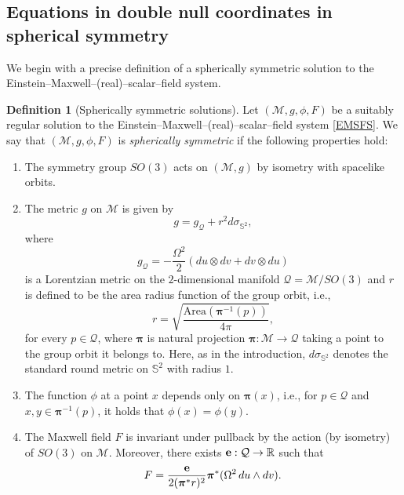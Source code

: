 \documentclass[10pt, reqno]{amsart}
\theoremstyle{definition}
\newtheorem{definition}[theorem]{Definition}
\theoremstyle{remark}
\theoremstyle{conjecture}
\numberwithin{equation}{section}
\newcommand{\0}{\emptyset}
\newcommand{\Omg}{\Omega}
\newcommand{\bfe}{{\bf e}}
\newcommand{\calM}{\mathcal M}
\newcommand{\f}{\frac}
\begin{document}
\subsection{Equations in double null coordinates in spherical symmetry}
We begin with a precise definition of a spherically symmetric solution to the Einstein--Maxwell--(real)--scalar--field system.
\begin{definition}[Spherically symmetric solutions]\label{def.SS}
Let $(\mathcal M,g,\phi,F)$ be a suitably regular solution to the Einstein--Maxwell--(real)--scalar--field system \eqref{EMSFS}. We say that $(\mathcal M,g,\phi,F)$ is \emph{spherically symmetric} if the following properties hold:
\begin{enumerate}
\item The symmetry group $SO(3)$ acts on $(\mathcal M,g)$ by isometry with spacelike orbits.
\item The metric $g$ on $\mathcal M$ is given by
\begin{equation}\label{SS.metric.1}
g=g_{\mathcal Q}+r^2 d\sigma_{\mathbb S^2},
\end{equation}
where
\begin{equation}\label{SS.metric.2}
g_{\mathcal Q}=-\f{\Omg^2 }{2}(du\otimes dv+dv\otimes du)
\end{equation}
is a Lorentzian metric on the $2$-dimensional manifold $\mathcal Q=\mathcal M/SO(3)$ and $r$ is defined to be the area radius function of the group orbit, i.e.,
$$r=\sqrt{\f{\mbox{Area}({\boldsymbol \pi}^{-1}(p))}{4\pi}},$$
for every $p\in \mathcal Q$, where ${\boldsymbol \pi}$ is natural projection ${\boldsymbol \pi}:\mathcal M\to \mathcal Q$ taking a point to the group orbit it belongs to. Here, as in the introduction, $d\sigma_{\mathbb S^2}$ denotes the standard round metric on $\mathbb S^2$ with radius $1$.
\item The function $\phi$ at a point $x$ depends only on ${\boldsymbol \pi}(x)$, i.e., for $p\in \mathcal Q$ and $x,y\in {\boldsymbol \pi}^{-1}(p)$, it holds that $\phi(x)=\phi(y)$.
\item The Maxwell field $F$ is invariant under pullback by the action (by isometry) of $SO(3)$ on $\calM$.
Moreover, there exists ${\bf e}:\mathcal Q\to \mathbb R$ such that
$$F=\f{\bfe}{2({\boldsymbol \pi}^* r)^2}{\boldsymbol \pi}^*(\Omg^2\,du\wedge dv).$$
\end{enumerate}
\end{definition}
\end{document}
